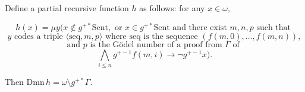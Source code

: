 Define a partial recursive function $h$ as follows: for any $x \in \omega$,

$$h(x) = \mu y \big( x \notin g^{+*} \text{Sent}, \text{ or } x \in g^{+*} \text{Sent} \text{ and there exist } m, n, p \text{ such that }$$
$$y \text{ codes a triple } \langle \text{seq}, m, p \rangle \text{ where } \text{seq} \text{ is the sequence } (f(m,0), \ldots, f(m,n)),$$
$$\text{and } p \text{ is the G\"{o}del number of a proof from } \Gamma \text{ of }$$
$$\bigwedge_{i \leq n} g^{+-1} f(m, i) \rightarrow \neg g^{+-1} x \big).$$

Then $\text{Dmn}\,h = \omega \setminus g^{+*} \Gamma$.
